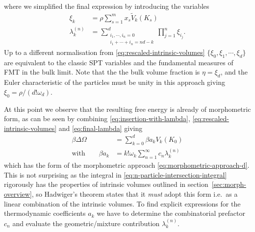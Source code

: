 \documentclass[11pt,twoside]{report}
\begin{document}
where we simplified the final expression by introducing the variables
\begin{subequations}
  \begin{align}
    \label{eq:spt-variables}
    \xi_k
    &=
    \rho \sum_{s = 1}^m x_s \widetilde{V}_k(K_s)
    \\
    \label{eq:little-lambda}
    \lambda_k^{(n)}
    &=
    \sum_{\substack{i_1, \cdots, i_n = 0 \\ i_1 + \cdots + i_n = nd - k}}^d
    \prod_{j=1}^n
    \xi_{i_j}.
  \end{align}
\end{subequations}
Up to a different normalisation from \eqref{eq:rescaled-intrinsic-volumes} $\{\xi_0, \xi_1, \cdots, \xi_d\}$ are equivalent to the classic SPT variables \cite{LebowitzJCP1965} and the fundamental measures of FMT \cite{RosenfeldPRL1989} in the bulk limit.
Note that the the bulk volume fraction is $\eta = \xi_d$, and the Euler characteristic of the particles must be unity in this approach giving $\xi_0 = \rho / (d! \omega_d)$.

At this point we observe that the resulting free energy is already of morphometric form, as can be seen by combining \eqref{eq:insertion-with-lambda}, \eqref{eq:rescaled-intrinsic-volumes} and \eqref{eq:final-lambda} giving
\begin{subequations}\label{eq:morphometric-approach-from-virial}
  \begin{align}
    \beta \Delta \Omega
    &=
    \sum_{k=0}^d \beta a_k V_k(K_0)
    \\ \textrm{with} \qquad
    \beta a_k
    &=
    k! \omega_k \sum_{n=1}^\infty c_n \lambda_k^{(n)}
    \label{eq:a-coefficient}
  \end{align}
\end{subequations}
which has the form of the morphometric approach \eqref{eq:morphometric-approach-d}.
This is not surprising as the integral in \eqref{eq:n-particle-intersection-integral} rigorously has the properties of intrinsic volumes outlined in section~\ref{sec:morph-overview}, so Hadwiger's theorem \cite{Hadwiger1957} states that it \emph{must} adopt this form i.e.\ as a linear combination of the intrinsic volumes.
To find explicit expressions for the thermodynamic coefficients $a_k$ we have to determine the combinatorial prefactor $c_n$ and evaluate the geometric/mixture contribution $\lambda_k^{(n)}$.
\end{document}
